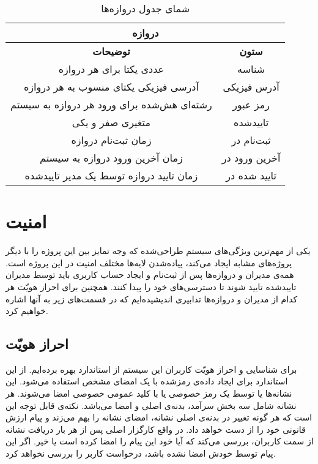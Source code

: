 \begin{table}[h!]
  \begin{center}
    \caption{شمای جدول دروازه‌ها}
    \label{table:gateways}
    \begin{tabular}{|c|c|} %
    	\hline
\multicolumn{2}{|c|}{\textbf{دروازه}}\\ \hline\hline
\textbf{توضیحات} & \textbf{ستون}\\
    	\hline
	عددی یکتا برای هر دروازه & شناسه\\
    	\hline
آدرسی فیزیکی یکتای منسوب به هر دروازه & آدرس فیزیکی\\
    	\hline
رشته‌ای هش‌شده برای ورود هر دروازه به سیستم & رمز عبور\\
    	\hline
متغیری صفر و یکی & تایید‌شده\\
    	\hline
زمان ثبت‌نام دروازه & ثبت‌نام در\\
    	\hline
زمان آخرین ورود دروازه به سیستم & آخرین ورود در\\
    	\hline
زمان تایید دروازه توسط یک مدیر تایید‌شده & تایید شده در\\
    	\hline
    \end{tabular}
  \end{center}
\end{table} 

\section{امنیت}
یکی از مهم‌ترین ویژگی‌های سیستم طراحی‌شده که وجه تمایز بین این پروژه را با دیگر پروژه‌های مشابه ایجاد می‌کند، پیاده‌شدن لایه‌ها مختلف امنیت در این پروژه است. همه‌ی مدیران و دروازه‌ها پس از ثبت‌نام و ایجاد حساب کاربری باید توسط مدیران تایید‌شده تایید شوند تا دسترسی‌های خود را پیدا کنند. همچنین برای احراز هویّت هر کدام از مدیران و دروازه‌ها تدابیری اندیشیده‌ایم که در قسمت‌های زیر به آنها اشاره خواهیم کرد.

\subsection{احراز هویّت}
برای شناسایی و احراز هویّت کاربران این سیستم از استاندارد  بهره برده‌ایم. از این استاندارد برای ایجاد داده‌ی رمزشده با یک امضای مشخص استفاده می‌شود. این نشانه‌ها یا توسط یک رمز خصوصی یا با کلید عمومی خصوصی امضا می‌شوند. هر نشانه‌ شامل سه بخش سرآمد، بدنه‌ی اصلی و امضا می‌باشد\cite{jones2015json}. نکته‌ی قابل‌ توجه این است که هر گونه تغییر در بدنه‌ی اصلی نشانه، امضای نشانه را بهم می‌زند و پیام ارزش قانونی خود را از دست خواهد داد. در واقع کارگزار اصلی پس از هر بار دریافت نشانه‌ از سمت کاربران، بررسی می‌کند که آیا خود این پیام را امضا کرده است یا خیر. اگر این پیام توسط خودش امضا نشده‌ باشد، درخواست کاربر را بررسی نخواهد کرد.

